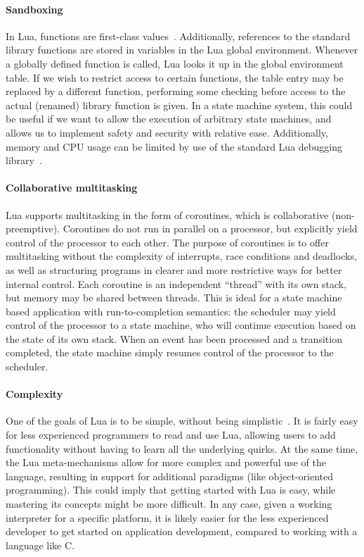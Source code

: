 \paragraph{Sandboxing}
In Lua, functions are first-class values~\cite[Ch.2.2]{manual:lua_reference_manual}. Additionally, references to the standard library functions are stored in variables in the Lua global environment. Whenever a globally defined function is called, Lua looks it up in the global environment table. If we wish to restrict access to certain functions, the table entry may be replaced by a different function, performing some checking before access to the actual (renamed) library function is given. In a state machine system, this could be useful if we want to allow the execution of arbitrary state machines, and allows us to implement safety and security with relative ease. Additionally, memory and CPU usage can be limited by use of the standard Lua debugging library~\cite[Ch.6.10]{manual:lua_reference_manual}.

\paragraph{Collaborative multitasking}
Lua supports multitasking in the form of coroutines, which is collaborative (non-preemptive). Coroutines do not run in parallel on a processor, but explicitly yield control of the processor to each other. The purpose of coroutines is to offer multitasking without the complexity of interrupts, race conditions and deadlocks, as well as structuring programs in clearer and more restrictive ways for better internal control. Each coroutine is an independent ``thread'' with its own stack, but memory may be shared between threads. This is ideal for a state machine based application with run-to-completion semantics: the scheduler may yield control of the processor to a state machine, who will continue execution based on the state of its own stack. When an event has been processed and a transition completed, the state machine simply resumes control of the processor to the scheduler.

\paragraph{Complexity}
One of the goals of Lua is to be simple, without being simplistic~\cite{article:the_implementation_of_lua}. It is fairly easy for less experienced programmers to read and use Lua, allowing users to add functionality without having to learn all the underlying quirks. At the same time, the Lua meta-mechanisms allow for more complex and powerful use of the language, resulting in support for additional paradigms (like object-oriented programming). This could imply that getting started with Lua is easy, while mastering its concepts might be more difficult. In any case, given a working interpreter for a specific platform, it is likely easier for the less experienced developer to get started on application development, compared to working with a language like C.

